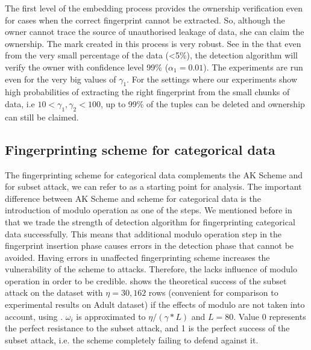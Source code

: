 The first level of the embedding process provides the ownership verification even for cases when the correct fingerprint cannot be extracted. 
So, although the owner cannot trace the source of unauthorised leakage of data, she can claim the ownership. The mark created in this process is very robust. See in the  that even from the very small percentage of the data (<5\%), the detection algorithm will verify the owner with confidence level 99\% ($\alpha_1=0.01$).
The experiments are run even for the very big values of $\gamma_1$. 
For the settings where our experiments show high probabilities of extracting the right fingerprint from the small chunks of data, i.e $10<\gamma_1,\gamma_2<100$, up to 99\% of the tuples can be deleted and ownership can still be claimed.      

\subsection{Fingerprinting scheme for categorical data}
The fingerprinting scheme for categorical data complements the AK Scheme and for subset attack, we can refer to  as a starting point for analysis. 
The important difference between AK Scheme and scheme for categorical data is the introduction of modulo operation as one of the steps. 
We mentioned before in  that we trade the strength of detection algorithm for fingerprinting categorical data successfully. 
This means that additional modulo operation step in the fingerprint insertion phase causes errors in the detection phase that cannot be avoided. 
Having errors in unaffected fingerprinting scheme increases the vulnerability of the scheme to attacks. 
Therefore, the  lacks influence of modulo operation in order to be credible. 
 shows the theoretical success of the subset attack on the dataset with $\eta = 30,162$ rows (convenient for comparison to experimental results on Adult dataset) if the effects of modulo are not taken into account, using .
$\omega_i$ is approximated to $\eta/(\gamma*L)$ and $L=80$. 
Value 0 represents the perfect resistance to the subset attack, and 1 is the perfect success of the subset attack, i.e. the scheme completely failing to defend against it.

